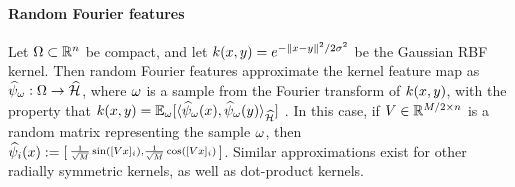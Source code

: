  \paragraph{Random Fourier features} Let $\Omega\subset\mathbb{R}^n$ be compact, and let $ k(x,y) = e^{-\|x-y\|^2/2\sigma^2}$ be the Gaussian RBF kernel. Then random Fourier features approximate the kernel feature map as $\widehat{\psi}_{\omega}:\Omega\to\widehat{\mathcal{H}}$, where $\omega$ is a sample from the Fourier transform of $k(x,y)$, with the property that $k(x,y) = \mathbb{E}_{\omega}[\langle\widehat{\psi}_{\omega}(x),\widehat{\psi}_{\omega}(y)\rangle_{\widehat{\mathcal{H}}}]$ \cite{rahimi2007random}. In this case, if $V\in\mathbb{R}^{M/2\times n}$ is a random matrix representing the sample $\omega$, then 
 $ 
  \widehat{\psi}_i(x) := \left[\begin{smallmatrix}
  \frac{1}{\sqrt{M}}\sin([V x]_i), \frac{1}{\sqrt{M}}\cos([V x]_i)
 \end{smallmatrix}\right]$. Similar approximations exist for other radially symmetric kernels, as well as dot-product kernels. 

